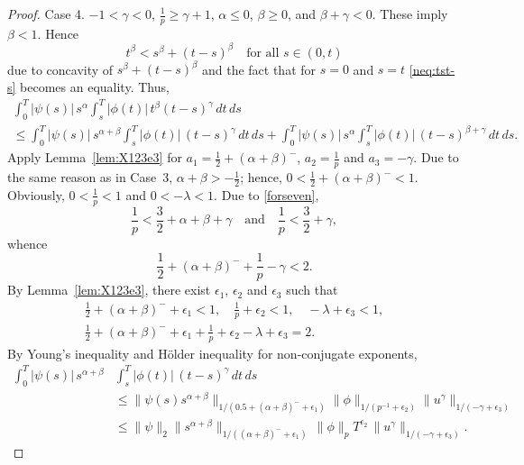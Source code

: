 \documentclass{article}
\theoremstyle{plain}
\theoremstyle{remark}
\theoremstyle{definition}
\begin{document}
\begin{proof}
Case 4. $-1<\gamma<0$, $\frac1p\ge\gamma+1$,
$\alpha\le 0$, $\beta\ge 0$, and
$\beta+\gamma<0$.
These imply $\beta<1$.
Hence
\begin{equation}
\label{neq:tst-s}
t^\beta < s^\beta + (t-s)^\beta
\quad \mbox{for all $s\in(0,t)$}
\end{equation}
due to concavity of $s^\beta + (t-s)^\beta$
and the fact that for $s=0$ and $s=t$
\eqref{neq:tst-s} becomes an equality.
Thus,
\begin{multline*}
		\int_0^T |\psi(s)|\, s^\alpha
		\int_s^T |\phi(t)|\, t^\beta (t{-}s)^\gamma
		\, dt \, ds
\\ \le
		\int_0^T\! |\psi(s)|\, s^{\alpha+\beta}
		\int_s^T\! |\phi(t)|\, (t{-}s)^\gamma
		\, dt \, ds
+
		\int_0^T\! |\psi(s)|\, s^\alpha
		\int_s^T\! |\phi(t)|\, (t{-}s)^{\beta+\gamma}
		\, dt \, ds .
\end{multline*}
Apply Lemma~\ref{lem:X123e3}
for $a_1 =\frac12 + (\alpha+\beta)^-$,
$a_2=\frac{1}{p}$ and $a_3 = -\gamma$.
Due to the same reason as in Case~3,
$\alpha+\beta>-\frac12$; hence,
$0<\frac12 + (\alpha+\beta)^-<1$.
Obviously, $0<\frac1p<1$ and $0<-\lambda<1$.
Due to \eqref{forseven},
\[
\frac1p < \frac32 + \alpha + \beta + \gamma
\quad \mbox{and} \quad
\frac1p < \frac32 + \gamma,
\]
whence
\[
\frac12 + (\alpha+\beta)^- + \frac1p - \gamma < 2.
\]
By Lemma~\ref{lem:X123e3}, there exist
$\epsilon_1$, $\epsilon_2$ and
$\epsilon_3$ such that
\begin{gather*}
\frac12 + (\alpha+\beta)^- + \epsilon_1
< 1, \quad
\frac{1}p + \epsilon_2 <1, \quad
-\lambda + \epsilon_3 < 1, \\
\frac12 + (\alpha+\beta)^- + \epsilon_1
+
\frac{1}p + \epsilon_2
-\lambda + \epsilon_3 = 2.
\end{gather*}
By Young's inequality and H\"older inequality
for non-conjugate exponents,
	\begin{align*}
		\int_0^T |\psi(s)|\, s^{\alpha+\beta}
		&\int_s^T |\phi(t)|\, (t{-}s)^\gamma
		\, dt \, ds
\\ &\le
\|\psi(s) s^{\alpha+\beta}\|_{1/(0.5+(\alpha+\beta)^- + \epsilon_1)}
\|\phi\|_{1/(p^{-1}+\epsilon_2)}
\|u^\gamma\|_{1/(-\gamma+\epsilon_3)}
\\ &\le
\|\psi\|_2 \|s^{\alpha+\beta}\|_{1/((\alpha+\beta)^- + \epsilon_1)} \,
\|\phi\|_p T^{\epsilon_2} \,
\|u^\gamma\|_{1/(-\gamma+\epsilon_3)}.
\end{align*}


\end{proof}
\end{document}
